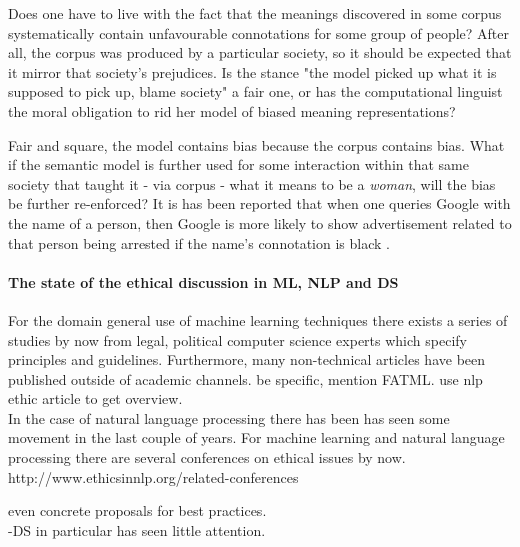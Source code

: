 \documentclass{article}
\begin{document}
Does one have to live with the fact that the meanings discovered in some corpus systematically contain unfavourable connotations for some group of people? After all, the corpus was produced by a particular society, so it should be expected that it mirror that society's prejudices. Is the stance "the model picked up what it is supposed to pick up, blame society" a fair one, or has the computational linguist the moral obligation to rid her model of biased meaning representations?

Fair and square, the model contains bias because the corpus contains bias. What if the semantic model is further used for some interaction within that same society that taught it - via corpus - what it means to be a \emph{woman}, will the bias be further re-enforced? It is has been reported that when one queries Google with the name of a person, then Google is more likely to show advertisement related to that person being arrested if the name's connotation is black \cite{sweeney2013discrimination}.

\paragraph{The state of the ethical discussion in ML, NLP and DS}
For the domain general use of machine learning techniques there exists a series of studies by now from legal, political computer science experts which specify principles and guidelines. Furthermore, many non-technical articles have been published outside of academic channels. 
be specific, mention FATML. use nlp ethic article to get overview.\\

In the case of natural language processing there has been  has seen some movement in the last couple of years.
For machine learning and natural language processing there are several  conferences on ethical issues by now.
http://www.ethicsinnlp.org/related-conferences


 even concrete proposals for best practices.\\
-DS in particular has seen little attention.
\end{document}
